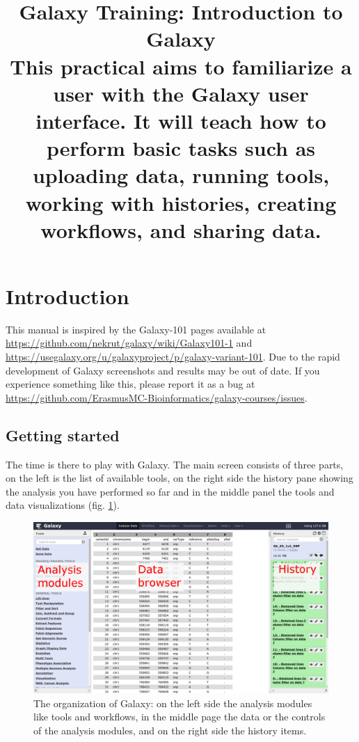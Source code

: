 \documentclass[11pt,a4paper]{article}
\begin{document}
\title{ \textit{\institute}\text{ }Galaxy Training: Introduction to Galaxy \\
{ \large This practical aims to familiarize a user with the Galaxy user interface. It will teach how to perform basic tasks such as uploading data, running tools, working with histories, creating workflows, and sharing data. } }

\author{ \authors }
\maketitle



\section*{Introduction}
This manual is inspired by the Galaxy-101 pages available at \url{https://github.com/nekrut/galaxy/wiki/Galaxy101-1} and \url{https://usegalaxy.org/u/galaxyproject/p/galaxy-variant-101}.
Due to the rapid development of Galaxy screenshots and results may be out of date. If you experience something like this, please report it as a bug at \url{https://github.com/ErasmusMC-Bioinformatics/galaxy-courses/issues}.


\subsection*{Getting started}
The time is there to play with Galaxy. The main screen consists of three parts, on the left is the list of available tools, on the right side the history pane showing the analysis you have performed so far and in the middle panel the tools and data visualizations (fig. \ref{fig:organization_layout}).

\begin{figure}
 \center
  \includegraphics[width=\textwidth]{figures/galaxy_layout}
  \caption{\small{ The organization of Galaxy: on the left side the analysis modules like tools and workflows, in the middle page the data or the controls of the analysis modules, and on the right side the history items. }}
  \label{fig:organization_layout}
\end{figure}
\end{document}
